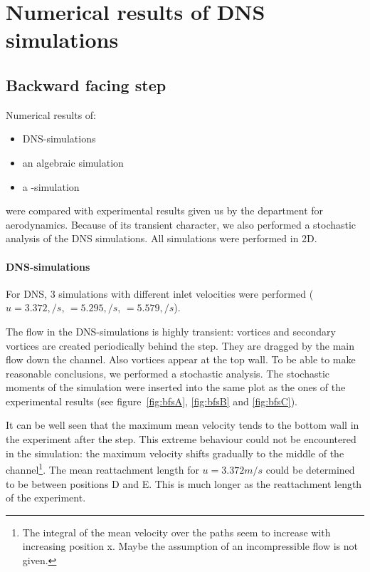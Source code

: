 \chapter{Numerical results of DNS simulations} %
\label{cha:numerical_results}

\section{Backward facing step} %
\label{sec:backward_facing_step}

Numerical results of:
\begin{itemize}
\item DNS-simulations
\item an algebraic simulation
\item a \ke-simulation
\end{itemize}
were compared with experimental results given us by the department for aerodynamics. Because of its transient character, we also performed a stochastic analysis of the DNS simulations. All simulations were performed in 2D.

\subsubsection*{DNS-simulations}

For DNS, 3 simulations with different inlet velocities were performed ($u=3.372,/s$, $=5.295,/s$, $=5.579,/s$).

\noii The flow in the DNS-simulations is highly transient: vortices and secondary vortices are created periodically behind the step. They are dragged by the main flow down the channel. Also vortices appear at the top wall. To be able to make reasonable conclusions, we performed a stochastic analysis. The stochastic moments of the simulation were inserted into the same plot as the ones of the experimental results (see figure~\ref{fig:bfsA}, \ref{fig:bfsB} and \ref{fig:bfsC}). 

\noii It can be well seen that the maximum mean velocity tends to the bottom wall in the experiment after the step. This extreme behaviour could not be encountered in the simulation: the maximum velocity shifts gradually to the middle of the channel\footnote{The integral of the mean velocity over the paths seem to increase with increasing position x. Maybe the assumption of an incompressible flow is not given.}. The mean reattachment length for $u=3.372m/s$ could be determined to be between positions D and E. This is much longer as the reattachment length of the experiment.

